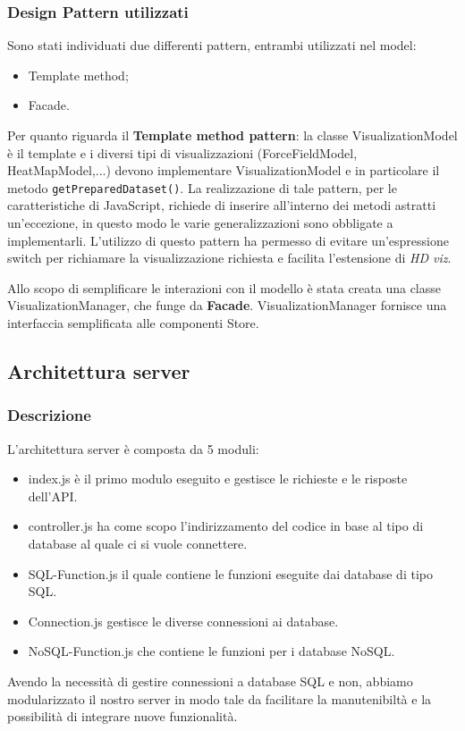     \subsubsection{Design Pattern utilizzati}
        Sono stati individuati due differenti pattern, entrambi utilizzati nel model:
        \begin{itemize}
            \item Template method;
            \item Facade.
        \end{itemize}
        Per quanto riguarda il \textbf{Template method pattern}: la classe VisualizationModel è il template e i diversi tipi di visualizzazioni (ForceFieldModel, HeatMapModel,...) devono implementare VisualizationModel e in particolare il metodo \texttt{getPreparedDataset()}. La realizzazione di tale pattern, per le caratteristiche di JavaScript, richiede di inserire all'interno dei metodi astratti un'eccezione, in questo modo le varie generalizzazioni sono obbligate a implementarli. L'utilizzo di questo pattern ha permesso di evitare un'espressione switch per richiamare la visualizzazione richiesta e facilita l'estensione di \emph{HD viz}.
        
        Allo scopo di semplificare le interazioni con il modello è stata creata una classe VisualizationManager, che funge da \textbf{Facade}. VisualizationManager fornisce una interfaccia semplificata alle componenti Store.
        
        \pagebreak
        
\subsection{Architettura server}
    \subsubsection{Descrizione}
    L'architettura server è composta da 5 moduli:
    \begin{itemize}
            \item index.js è il primo modulo eseguito e gestisce le richieste e le risposte dell'API.
            \item  controller.js ha come scopo l'indirizzamento del codice in base al tipo di database al quale ci si vuole connettere.
            \item SQL-Function.js il quale contiene le funzioni eseguite dai database di tipo SQL.
            \item Connection.js gestisce le diverse connessioni ai database.
            \item NoSQL-Function.js che contiene le funzioni per i database NoSQL.
        \end{itemize}
    Avendo la necessità di gestire connessioni a database SQL e non, abbiamo modularizzato il nostro server in modo tale da facilitare la manutenibiltà e la possibilità di integrare nuove funzionalità.
    
